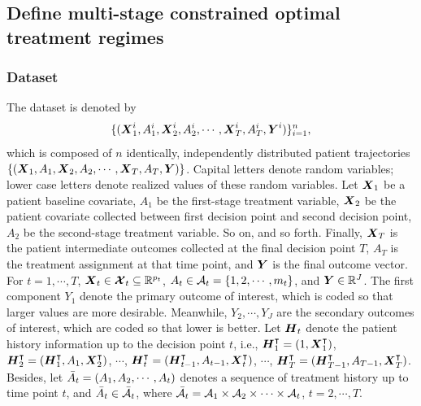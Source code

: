 \subsection{Define multi-stage constrained optimal treatment regimes }
\subsubsection{Dataset}
 The dataset is denoted by $$\{(\boldsymbol{X}_{1}^{i}, A_{1}^{i},\boldsymbol{X}_{2}^{i}, A_{2}^{i}, \cdots, \boldsymbol{X}_{T}^{i}, A_{T}^{i}, \boldsymbol{Y}^{i})\}_{i=1}^{n},$$ which is composed of $n$ identically, independently distributed patient trajectories\\ $\{(\boldsymbol{X}_{1}, A_{1},\boldsymbol{X}_{2}, A_{2}, \cdots, \boldsymbol{X}_{T}, A_{T}, \boldsymbol{Y})\}$. Capital letters denote random variables; lower case letters denote realized values of these random variables. Let $\boldsymbol{X}_1$ be a patient baseline covariate, $A_1$ be the first-stage treatment variable, $\boldsymbol{X}_2$ be the patient covariate collected between first decision point and second decision point, $A_2$ be the second-stage treatment variable. So on, and so forth. Finally, $\boldsymbol{X}_T$ is the patient intermediate outcomes collected at the final decision point $T$, $A_T$ is the treatment assignment at that time point, and $\boldsymbol{Y}$ is the final outcome vector. For $t = 1, \cdots, T$, $\boldsymbol{X}_t\in \boldsymbol{\mathcal{X}}_t \subseteq{\mathbb{R}^{p_t}}$, $A_{t} \in \mathcal{A}_t = \{ 1, 2, \cdots, m_t\}$, and $\boldsymbol{Y} \in \mathbb{R}^J$. The first component $Y_1$ denote the primary outcome of interest, which is coded so that larger values are more desirable. Meanwhile, $Y_2, \cdots, Y_J$ are the secondary outcomes of interest, which are coded so that lower is better. Let $\boldsymbol{H}_t$ denote the patient history information up to the decision point $t$, i.e., $\boldsymbol{H}^\intercal_1 = (1, \boldsymbol{X}^\intercal_1)$, $\boldsymbol{H}^\intercal_2 = ( \boldsymbol{H}^\intercal_1, A_1, \boldsymbol{X}^\intercal_2)$, $\cdots$,  $\boldsymbol{H}^\intercal_t = (\boldsymbol{H}^\intercal_{t-1}, A_{t-1}, \boldsymbol{X}^\intercal_t)$, $\cdots$, $\boldsymbol{H}^\intercal_T = (\boldsymbol{H}^\intercal_{T-1}, A_{T-1}, \boldsymbol{X}^\intercal_T)$. Besides, let $\bar{A}_t = (A_1, A_2, \cdots, A_t)$ denotes a sequence of treatment history up to time point $t$, and $\bar{A}_t \in \bar{\mathcal{A}_t}$, where $\bar{\mathcal{A}_t} = \mathcal{A}_1 \times \mathcal{A}_2 \times \cdots \times \mathcal{A}_t$, $t =2 , \cdots, T$. %
 
